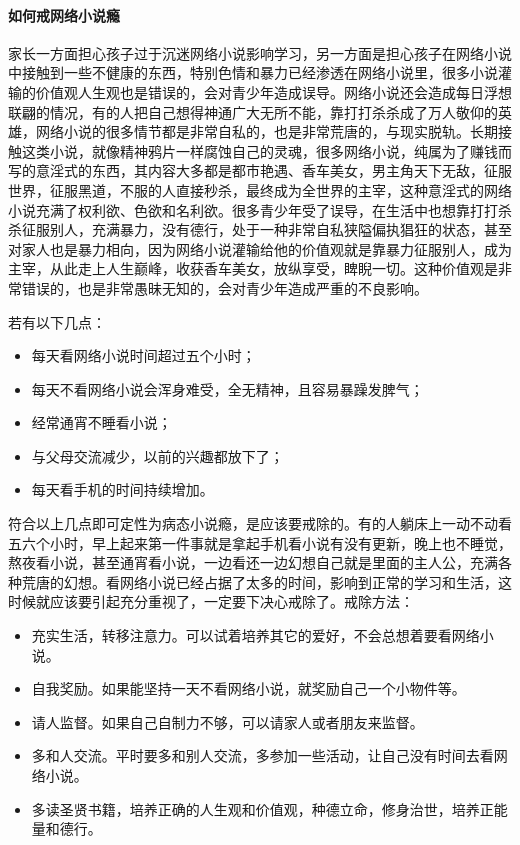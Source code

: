 \paragraph{如何戒网络小说瘾}

家长一方面担心孩子过于沉迷网络小说影响学习，另一方面是担心孩子在网络小说中接触到一些不健康的东西，特别色情和暴力已经渗透在网络小说里，很多小说灌输的价值观人生观也是错误的，会对青少年造成误导。网络小说还会造成每日浮想联翩的情况，有的人把自己想得神通广大无所不能，靠打打杀杀成了万人敬仰的英雄，网络小说的很多情节都是非常自私的，也是非常荒唐的，与现实脱轨。长期接触这类小说，就像精神鸦片一样腐蚀自己的灵魂，很多网络小说，纯属为了赚钱而写的意淫式的东西，其内容大多都是都市艳遇、香车美女，男主角天下无敌，征服世界，征服黑道，不服的人直接秒杀，最终成为全世界的主宰，这种意淫式的网络小说充满了权利欲、色欲和名利欲。很多青少年受了误导，在生活中也想靠打打杀杀征服别人，充满暴力，没有德行，处于一种非常自私狭隘偏执猖狂的状态，甚至对家人也是暴力相向，因为网络小说灌输给他的价值观就是靠暴力征服别人，成为主宰，从此走上人生巅峰，收获香车美女，放纵享受，睥睨一切。这种价值观是非常错误的，也是非常愚昧无知的，会对青少年造成严重的不良影响。

若有以下几点：\begin{multicols}{2}
    \begin{itemize}
        \item 每天看网络小说时间超过五个小时；
        \item 每天不看网络小说会浑身难受，全无精神，且容易暴躁发脾气；
        \item 经常通宵不睡看小说；
        \item 与父母交流减少，以前的兴趣都放下了；
        \item 每天看手机的时间持续增加。
    \end{itemize}
\end{multicols} 符合以上几点即可定性为病态小说瘾，是应该要戒除的。有的人躺床上一动不动看五六个小时，早上起来第一件事就是拿起手机看小说有没有更新，晚上也不睡觉，熬夜看小说，甚至通宵看小说，一边看还一边幻想自己就是里面的主人公，充满各种荒唐的幻想。看网络小说已经占据了太多的时间，影响到正常的学习和生活，这时候就应该要引起充分重视了，一定要下决心戒除了。戒除方法：\begin{multicols}{2}
    \begin{itemize}
        \item 充实生活，转移注意力。可以试着培养其它的爱好，不会总想着要看网络小说。
        \item 自我奖励。如果能坚持一天不看网络小说，就奖励自己一个小物件等。
        \item 请人监督。如果自己自制力不够，可以请家人或者朋友来监督。
        \item 多和人交流。平时要多和别人交流，多参加一些活动，让自己没有时间去看网络小说。
        \item 多读圣贤书籍，培养正确的人生观和价值观，种德立命，修身治世，培养正能量和德行。
    \end{itemize}
\end{multicols}

